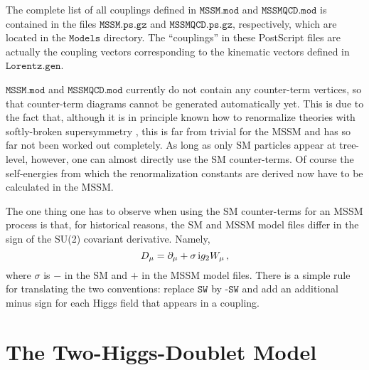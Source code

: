 \documentclass[twoside,12pt]{article}
\makeatletter
\def\indextt#1{\index{#1@\texttt{#1}}}
\def\ri{{\rm i}}
\def\Code#1{\ensuremath{\texttt{#1}}}
\makeatother
\begin{document}
\begin{appendix}
The complete list of all couplings defined in \Code{MSSM.mod} and 
\Code{MSSMQCD.mod} is contained in the files \Code{MSSM.ps.gz} and
\Code{MSSMQCD.ps.gz}, respectively, which are located in the \Code{Models}
directory.  The ``couplings'' in these PostScript files are actually the
coupling vectors corresponding to the kinematic vectors defined in
\Code{Lorentz.gen}.

\Code{MSSM.mod} and \Code{MSSMQCD.mod} currently do not contain any
counter-term vertices, so that counter-term diagrams cannot be generated
automatically yet.  This is due to the fact that, although it is in
principle known how to renormalize theories with softly-broken
supersymmetry \cite{HoKS00}, this is far from trivial for the MSSM and has
so far not been worked out completely.  As long as only SM particles 
appear at tree-level, however, one can almost directly use the SM 
counter-terms.  Of course the self-energies from which the renormalization 
constants are derived now have to be calculated in the MSSM.

The one thing one has to observe when using the SM counter-terms for an
MSSM process is that, for historical reasons, the SM and MSSM model files
differ in the sign of the SU(2) covariant derivative.  Namely,
$$
D_\mu = \partial_\mu + \sigma\,\ri g_2 W_\mu\,,
$$
where $\sigma$ is $-$ in the SM and $+$ in the MSSM model files.  There is
a simple rule for translating the two conventions: replace \Code{SW} by
\Code{-SW} and add an additional minus sign for each Higgs field that
appears in a coupling.


\section{The Two-Higgs-Doublet Model}%
\label{sect:thdm}%
%
\indextt{THDM.mod}%


\end{appendix}
\end{document}
